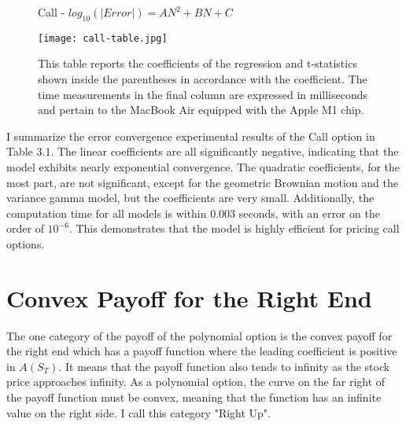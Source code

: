 \begin{figure}[ht]
    \begin{table}[H]
      \centering
      \caption[$log_{10}(|Error|)=AN^2+BN+C$]{Call - $log_{10}(|Error|)=AN^2+BN+C$}
    \end{table}
    
    \texttt{[image: call-table.jpg]}
    \caption*{\small{This table reports the coefficients of the regression and t-statistics shown inside the parentheses in accordance with the coefficient. The time measurements in the final column are expressed in milliseconds and pertain to the MacBook Air equipped with the Apple M1 chip.}}
\end{figure}

  



I summarize the error convergence experimental results of the Call option in Table 3.1. The linear coefficients are all significantly negative, indicating that the model exhibits nearly exponential convergence. The quadratic coefficients, for the most part, are not significant, except for the geometric Brownian motion and the variance gamma model, but the coefficients are very small. Additionally, the computation time for all models is within 0.003 seconds, with an error on the order of $10^{-6}$. This demonstrates that the model is highly efficient for pricing call options.


\section{Convex Payoff for the Right End}
The one category of the payoff of the polynomial option is the convex payoff for the right end which has a payoff function where the leading coefficient is positive in $A \left(S_T\right)$. It means that the payoff function also tends to infinity as the stock price approaches infinity. As a polynomial option, the curve on the far right of the payoff function must be convex, meaning that the function has an infinite value on the right side. I call this category "Right Up".

